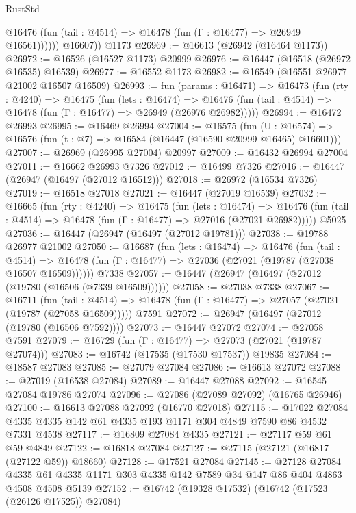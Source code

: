 \begin{lexlean}{RustStd}
\begin{coremodule}
{\begin{coremodule}
{{{{{{{{{{{{{{{{{{{{{{{{{{{{{{{{{{{{{{{{{{{{{{{{{{{{{{{              @16476 (fun (tail : @4514) => @16478 (fun (Γ : @16477) => @26949 @16561))))))
        @16607))
    @1173
@26969 := @16613 (@26942 (@16464 @1173))
@26972 := @16526 (@16527 @1173) @20999
@26976 := @16447 (@16518 (@26972 @16535) @16539)
@26977 := @16552 @1173
@26982 := @16549 (@16551 @26977 @21002 @16507 @16509)
@26993 := fun (params : @16471) =>
  @16473
    (fun (rty : @4240) =>
    @16475
      (fun (lets : @16474) =>
      @16476 (fun (tail : @4514) => @16478 (fun (Γ : @16477) => @26949 (@26976 @26982)))))
@26994 := @16472 @26993
@26995 := @16469 @26994
@27004 := @16575
    (fun (U : @16574) => @16576 (fun (t : @7) => @16584 (@16447 (@16590 @20999 @16465) @16601)))
@27007 := @26969 (@26995 @27004) @20997
@27009 := @16432 @26994 @27004
@27011 := @16662 @26993 @7326
@27012 := @16499 @7326
@27016 := @16447 (@26947 (@16497 (@27012 @16512)))
@27018 := @26972 (@16534 @7326)
@27019 := @16518 @27018
@27021 := @16447 (@27019 @16539)
@27032 := @16665
    (fun (rty : @4240) =>
    @16475
      (fun (lets : @16474) =>
      @16476 (fun (tail : @4514) => @16478 (fun (Γ : @16477) => @27016 (@27021 @26982)))))
    @5025
@27036 := @16447 (@26947 (@16497 (@27012 @19781)))
@27038 := @19788 @26977 @21002
@27050 := @16687
    (fun (lets : @16474) =>
    @16476
      (fun (tail : @4514) =>
      @16478 (fun (Γ : @16477) => @27036 (@27021 (@19787 (@27038 @16507 @16509))))))
    @7338
@27057 := @16447 (@26947 (@16497 (@27012 (@19780 (@16506 (@7339 @16509))))))
@27058 := @27038 @7338
@27067 := @16711
    (fun (tail : @4514) => @16478 (fun (Γ : @16477) => @27057 (@27021 (@19787 (@27058 @16509)))))
    @7591
@27072 := @26947 (@16497 (@27012 (@19780 (@16506 @7592))))
@27073 := @16447 @27072
@27074 := @27058 @7591
@27079 := @16729 (fun (Γ : @16477) => @27073 (@27021 (@19787 @27074)))
@27083 := @16742 (@17535 (@17530 @17537)) @19835
@27084 := @18587 @27083
@27085 := @27079 @27084
@27086 := @16613 @27072
@27088 := @27019 (@16538 @27084)
@27089 := @16447 @27088
@27092 := @16545 @27084 @19786 @27074
@27096 := @27086 (@27089 @27092) (@16765 @26946)
@27100 := @16613 @27088 @27092 (@16770 @27018)
@27115 := @17022 @27084 @4335 @4335 @142 @61 @4335 @193 @1171 @304 @4849 @7590 @86 @4532 @7331 @4538
@27117 := @16809 @27084 @4335
@27121 := @27117 @59 @61 @59 @4849
@27122 := @16818 @27084
@27127 := @27115 (@27121 (@16817 (@27122 @59)) @18660)
@27128 := @17521 @27084
@27145 := @27128
    @27084
    @4335
    @61
    @4335
    @1171
    @303
    @4335
    @142
    @7589
    @34
    @147
    @86
    @404
    @4863
    @4508
    @4508
    @5139
@27152 := @16742 (@19328 @17532) (@16742 (@17523 (@26126 @17525)) @27084)
}}}}}}}}}}}}}}}}}}}}}}}}}}}}}}}}}}}}}}}}}}}}}}}}}}}}}}}
\end{coremodule}}
\end{coremodule}
\end{lexlean}
